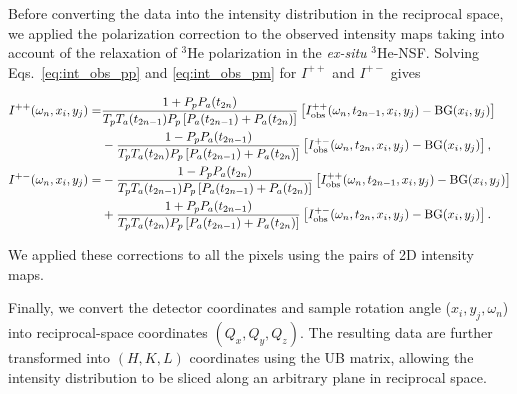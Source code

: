 \documentclass[%
 reprint,
superscriptaddress,
 amsmath,amssymb,
 aps,
floatfix,
]{revtex4-2}
\newcommand{\He}{$^3$He }
\newcommand{\Hensf}{$^3$He-NSF}
\begin{document}
Before converting the data into the intensity distribution in the reciprocal space, we applied the polarization correction to the observed intensity maps taking into account of the relaxation of \He polarization in the \textit{ex-situ}  \Hensf.
Solving Eqs.~\ref{eq:int_obs_pp} and \ref{eq:int_obs_pm} for $I^{++}$ and $I^{+-}$ gives
\begin{widetext}
    \begin{align}
        I^{++}(\omega_n,x_i,y_j) =&
        \frac{1+P_pP_a(t_{2n})}
        {T_pT_a(t_{2n-1})P_p\left[P_a(t_{2n-1})+P_a(t_{2n})\right]}
        \left[I^{++}_\mathrm{obs}(\omega_n,t_{2n-1},x_i,y_j)-\mathrm{BG}(x_i,y_j)\right]
        \notag\\
        &-
        \frac{1-P_pP_a(t_{2n-1})}
        {T_pT_a(t_{2n})P_p\left[P_a(t_{2n-1})+P_a(t_{2n})\right]}
        \left[I^{+-}_\mathrm{obs}(\omega_n,t_{2n},x_i,y_j)-\mathrm{BG}(x_i,y_j)\right],
        \\
        I^{+-}(\omega_n,x_i,y_j) =&
        -
        \frac{1-P_pP_a(t_{2n})}
        {T_pT_a(t_{2n-1})P_p\left[P_a(t_{2n-1})+P_a(t_{2n})\right]}
        \left[I^{++}_\mathrm{obs}(\omega_n,t_{2n-1},x_i,y_j)-\mathrm{BG}(x_i,y_j)\right]
        \notag\\
        &+
        \frac{1+P_pP_a(t_{2n-1})}
        {T_pT_a(t_{2n})P_p\left[P_a(t_{2n-1})+P_a(t_{2n})\right]}
        \left[I^{+-}_\mathrm{obs}(\omega_n,t_{2n},x_i,y_j)-\mathrm{BG}(x_i,y_j)\right].
        \label{eq:int_corr}
    \end{align}
\end{widetext}
We applied these corrections to all the pixels using the pairs of 2D intensity maps.

Finally, we convert the detector coordinates and sample rotation angle ($x_i,y_j, \omega_n$) into reciprocal-space coordinates $(Q_x,Q_y,Q_z)$.
The resulting data are further transformed into $(H,K,L)$ coordinates using the UB matrix, allowing the intensity distribution to be sliced along an arbitrary plane in reciprocal space.
\end{document}
